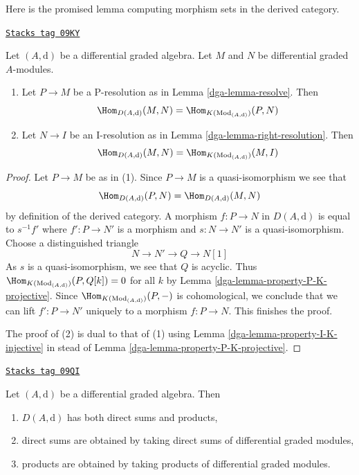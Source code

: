 Here is the promised lemma computing morphism sets in the
derived category.

\begin{lemma}
\label{dga-lemma-hom-derived}
\href{https://stacks.math.columbia.edu/tag/09KY}{\texttt{Stacks tag 09KY}}

Let $(A, \text{d})$ be a differential graded algebra.
Let $M$ and $N$ be differential graded $A$-modules.
\begin{enumerate}
\item Let $P \to M$ be a P-resolution as in
Lemma \ref{dga-lemma-resolve}. Then
$$
\Hom_{D(A, \text{d})}(M, N) =
\Hom_{K(\text{Mod}_{(A, \text{d})})}(P, N)
$$
\item Let $N \to I$ be an I-resolution as in
Lemma \ref{dga-lemma-right-resolution}. Then
$$
\Hom_{D(A, \text{d})}(M, N) =
\Hom_{K(\text{Mod}_{(A, \text{d})})}(M, I)
$$
\end{enumerate}
\end{lemma}

\begin{proof}

Let $P \to M$ be as in (1). Since $P \to M$ is a quasi-isomorphism we see that
$$
\Hom_{D(A, \text{d})}(P, N) = \Hom_{D(A, \text{d})}(M, N)
$$
by definition of the derived category. A morphism
$f : P \to N$ in $D(A, \text{d})$ is equal to
$s^{-1}f'$ where $f' : P \to N'$ is a morphism and
$s : N \to N'$ is a quasi-isomorphism. Choose a distinguished triangle
$$
N \to N' \to Q \to N[1]
$$
As $s$ is a quasi-isomorphism, we see that $Q$ is acyclic. Thus
$\Hom_{K(\text{Mod}_{(A, \text{d})})}(P, Q[k]) = 0$ for all $k$ by
Lemma \ref{dga-lemma-property-P-K-projective}. Since
$\Hom_{K(\text{Mod}_{(A, \text{d})})}(P, -)$
is cohomological, we conclude that we can lift $f' : P \to N'$
uniquely to a morphism $f : P \to N$. This finishes the proof.

\medskip\noindent
The proof of (2) is dual to that of (1) using
Lemma \ref{dga-lemma-property-I-K-injective} in stead of
Lemma \ref{dga-lemma-property-P-K-projective}.
\end{proof}

\begin{lemma}
\label{dga-lemma-derived-products}
\href{https://stacks.math.columbia.edu/tag/09QI}{\texttt{Stacks tag 09QI}}

Let $(A, \text{d})$ be a differential graded algebra. Then
\begin{enumerate}
\item $D(A, \text{d})$ has both direct sums and products,
\item direct sums are obtained by taking direct sums of differential graded
modules,
\item products are obtained by taking products of differential
graded modules.
\end{enumerate}
\end{lemma}

